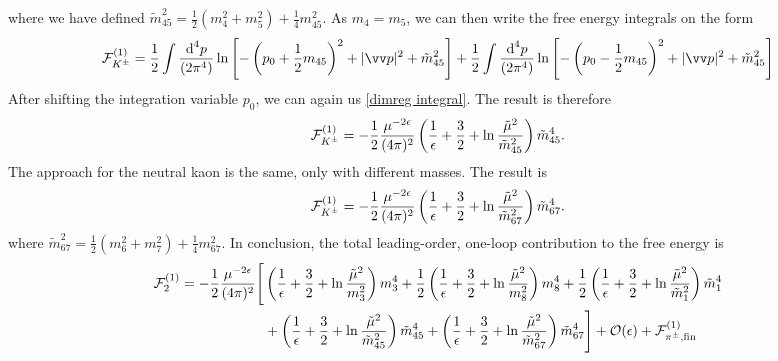 %
where we have defined 
$
\tilde m_{45}^2 = \frac{1}{2}(m_4^2 + m_5^2) + \frac{1}{4} m_{45}^2.
$
As $m_4 = m_5$, we can then write the free energy integrals on the form
%
\begin{equation} 
    \nonumber
    \Eff_\Kpm^{(1)}
    =
    \frac{1}{2} \int \frac{\dd^4 p}{(2\pi^4)}
    \ln \left[
        - \left(p_0 + \frac{1}{2}m_{45}\right)^2 
        + |\vv p|^2 
        + \tilde m_{45}^2 
    \right]
    +
    \frac{1}{2}
    \int \frac{\dd^4 p}{(2\pi^4)}
    \ln \left[
        - \left(p_0 - \frac{1}{2}m_{45}\right)^2 
        + |\vv p|^2 
        + \tilde m_{45}^2 
    \right]
\end{equation}
%
After shifting the integration variable $p_0$, we can again us \autoref{dimreg integral}.
The result is therefore
%
\begin{equation}
    \mathcal{F}_{K^\pm}^{(1)}
    =
    - \frac{1}{2} \frac{\mu^{-2 \epsilon} }{(4\pi)^2} 
    \left(
        \frac{1}{\epsilon} + \frac{3}{2} + \ln \frac{\tilde \mu^2}{\tilde m_{45}^2}
    \right)\tilde m_{45}^4.
\end{equation}
%
The approach for the neutral kaon is the same, only with different masses.
The result is
%
\begin{equation}
    \mathcal{F}_{K^\pm}^{(1)}
    =
    - \frac{1}{2} \frac{ \mu^{-2 \epsilon}}{(4\pi)^2} 
    \left(
        \frac{1}{\epsilon} + \frac{3}{2} + \ln \frac{\tilde \mu^2}{\tilde m_{67}^2}
    \right)\tilde m_{67}^4.
\end{equation}
%
where
$
\tilde m_{67}^2 = \frac{1}{2}(m_6^2 + m_7^2) + \frac{1}{4} m_{67}^2.
$
In conclusion, the total leading-order, one-loop contribution to the free energy is
%
\begin{align}
    \label{one-loop free energy}
    \nonumber
    \mathcal{F}^{(1)}_2
    =
    -\frac{1}{2} \frac{  \mu^{-2\epsilon}}{(4 \pi)^2} 
    \Bigg[&
        \left(
            \frac{1}{\epsilon} + \frac{3}{2} + \ln\frac{\tilde \mu^2}{m_3^2}
        \right)
        m_3^4
        +
        \frac{1}{2}
        \left(
            \frac{1}{\epsilon} + \frac{3}{2} + \ln\frac{\tilde \mu^2}{m_8^2} 
        \right)
        m_8^4+
        \frac{1}{2}
        \left(
            \frac{1}{\epsilon} + \frac{3}{2} + \ln\frac{\tilde \mu^2}{\tilde m_1^2}
        \right)
        \tilde m_1^4 \\ \nonumber
        & +
        \left(
            \frac{1}{\epsilon} + \frac{3}{2} + \ln\frac{\tilde \mu^2}{\tilde m_{45}^2}
        \right)
        \tilde m_{45}^4
        +
        \left(
            \frac{1}{\epsilon} + \frac{3}{2} + \ln\frac{\tilde \mu^2}{\tilde m_{67}^2} 
        \right)
        \tilde m_{67}^4
    \Bigg]
    + \mathcal O(\epsilon)
    + \mathcal{F}^{(1)}_{{\pi^\pm},\text{fin}}
\end{align}





